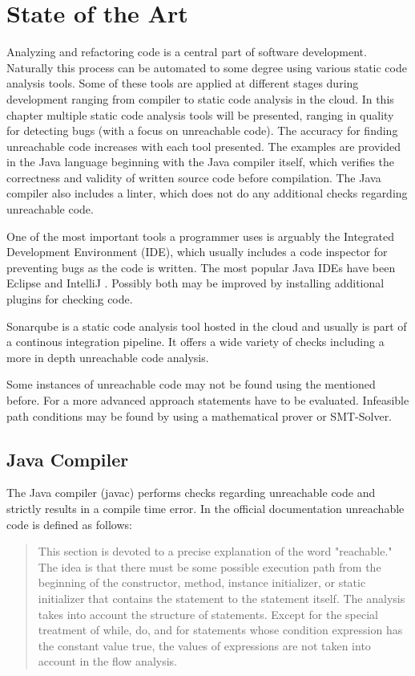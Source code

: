 
\chapter{State of the Art}
\label{cha:state of the art}

Analyzing and refactoring code is a central part of software development. Naturally this process can be automated to some degree using various static code analysis tools. 
Some of these tools are applied at different stages during development ranging from compiler to static code analysis in the cloud.
In this chapter multiple static code analysis tools will be presented, ranging in quality for detecting bugs (with a focus on unreachable code).
The accuracy for finding unreachable code increases with each tool presented. 
The examples are provided in the Java language beginning with the Java compiler itself, which verifies the correctness and validity of written source code before compilation. 
The Java compiler also includes a linter, which does not do any additional checks regarding unreachable code. 


One of the most important tools a programmer uses is arguably the Integrated Development Environment (IDE), which usually includes a code inspector for preventing bugs as the code is written. 
The most popular Java IDEs have been Eclipse \cite{incCommunityOpenInnovation} and IntelliJ \cite{IntelliJIDEACapable}. 
Possibly both may be improved by installing additional plugins for checking code.


Sonarqube \cite{sonarqube} is a static code analysis tool hosted in the cloud and usually is part of a continous integration pipeline. It offers a wide variety of checks including a more in depth unreachable code analysis.


Some instances of unreachable code may not be found using the mentioned before. For a more advanced approach statements have to be evaluated. Infeasible path conditions may be found by using a mathematical prover or SMT-Solver.
\clearpage
\pagebreak
\section{Java Compiler}
\label{sec:Java compiler}

The Java compiler (javac) performs checks regarding unreachable code and strictly results in a compile time error. 
In the official documentation \cite{Chapter14Blocks} unreachable code is defined as follows:
\begin{quote}
\label{quote:Java unreachable definition}
This section is devoted to a precise explanation of the word "reachable." 
The idea is that there must be some possible execution path from the beginning of the constructor, method, instance initializer, or static initializer that contains the statement to the statement itself. The analysis takes into account the structure of statements. Except for the special treatment of while, do, and for statements whose condition expression has the constant value true, the values of expressions are not taken into account in the flow analysis.
\end{quote}


